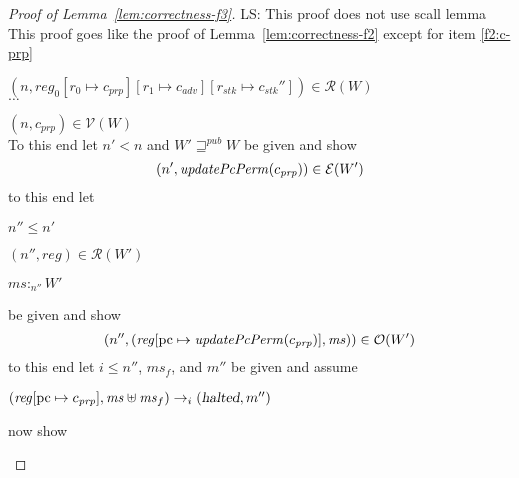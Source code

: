 \documentclass[a4paper]{article}
\newcommand{\update}[2]{[#1 \mapsto #2]}
\newcommand\lau[1]{{\color{purple} \sf \footnotesize {LS: #1}}\\}
\newcommand{\var}[1]{\mathit{#1}}
\newcommand{\hs}{\var{ms}}
\newcommand{\ms}{\hs}
\newcommand{\pcreg}{\mathrm{pc}}
\newcommand{\reg}{\var{reg}}
\newcommand{\heap}{\var{mem}}
\newcommand{\adv}{\var{adv}}
\newcommand{\stk}{\var{stk}}
\newcommand{\prp}{\var{prp}}
\newcommand{\halted}{\textsl{halted}}
\newcommand{\plainfun}[2]{
  \ifthenelse{\equal{#2}{}}
  {\mathit{#1}}
  {\mathit{#1}(#2)}
}
\newcommand{\updatePcPerm}[1]{\plainfun{updatePcPerm}{#1}}
\newcommand{\futurewk}{\mathbin{\sqsupseteq}^{\var{pub}}}
\newcommand{\heapSat}[3][\heap]{#1 :_{#2} #3}
\newcommand{\asmType}{\plaindom{AsmType}}
\newcommand{\plaindom}[1]{\mathrm{#1}}
\newcommand{\intr}[2]{\mathcal{#1}}
\newcommand{\valueintr}[1]{\intr{V}{#1}}
\newcommand{\exprintr}[1]{\intr{E}{#1}}
\newcommand{\regintr}[1]{\intr{R}{#1}}
\newcommand{\stdvr}{\valueintr{\asmType}}
\newcommand{\stder}{\exprintr{\asmType}}
\newcommand{\stdrr}{\regintr{\asmType}}
\newcommand{\observations}{\mathcal{O}}
\newcommand{\npair}[2][n]{\left(#1,#2 \right)}
\newcommand{\step}[1][]{\rightarrow_{#1}}
\begin{document}
\begin{proof}[Proof of Lemma~\ref{lem:correctness-f3}]
  \lau{This proof does not use scall lemma}
  This proof goes like the proof of Lemma~\ref{lem:correctness-f2} except for item \ref{f2:c-prp}
  \begin{enumproof}[start=3]
  \item $\npair{\reg_0\update{r_0}{c_{\var{prp}}}\update{r_1}{c_\adv}\update{r_\stk}{c_\stk''}} \in \stdrr(W)$ \\
    $\dots$
    \begin{enumproof}[start=3]
    \item $\npair{c_{\var{prp}}} \in \stdvr(W)$ \\
      To this end let $n' < n$ and $W' \futurewk W$ be given and show
      \[
        \npair[n']{\updatePcPerm{c_\prp}} \in \stder(W')
      \]
      to this end let 
      \begin{enumproof}
      \item $n'' \leq n'$
      \item $\npair[n'']{\reg} \in \stdrr(W')$
      \item $\heapSat[\ms]{n''}{W'}$ \label{f3:mem-sat-mid}
      \end{enumproof}
      be given and show
      \[
        \npair[n'']{(\reg\update{\pcreg}{\updatePcPerm{c_\prp}},\ms)} \in \observations(W')
      \]
      to this end let $i \leq n''$, $\ms_f$, and $m''$ be given and assume
      \begin{enumproof}[resume]
      \item $(\reg\update{\pcreg}{c_\prp},\ms \uplus \ms_f) \step[i] (\halted,m'')$ \label{f3:mid-exec}
      \end{enumproof}
      now show


\end{enumproof}
\end{enumproof}
\end{proof}
\end{document}
